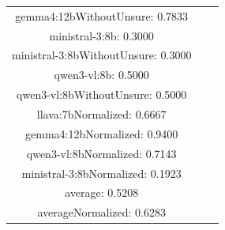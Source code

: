 \documentclass[a4paper]{article}
\begin{document}
\begin{tabular}{ccc}
gemma4:12bWithoutUnsure: 0.7833 \\ ministral-3:8b: 0.3000 \\ ministral-3:8bWithoutUnsure: 0.3000 \\ qwen3-vl:8b: 0.5000 \\ qwen3-vl:8bWithoutUnsure: 0.5000 \\ llava:7bNormalized: 0.6667 \\ gemma4:12bNormalized: 0.9400 \\ qwen3-vl:8bNormalized: 0.7143 \\ ministral-3:8bNormalized: 0.1923 \\ average: 0.5208 \\ averageNormalized: 0.6283 \end{minipage}\\
\end{tabular}

\vspace{5mm}
\end{document}
